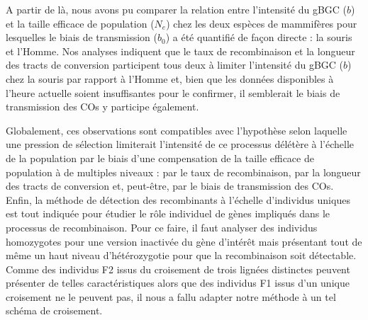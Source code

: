 {%
%
%
%

A partir de là, nous avons pu comparer la relation entre l'intensité du gBGC ($b$) et la taille efficace de population ($N_e$) chez les deux espèces de mammifères pour lesquelles le biais de transmission ($b_0$) a été quantifié de façon directe : la souris et l'Homme.
Nos analyses indiquent que le taux de recombinaison et la longueur des tracts de conversion participent tous deux à limiter l'intensité du gBGC ($b$) chez la souris par rapport à l'Homme et, bien que les données disponibles à l'heure actuelle soient insuffisantes pour le confirmer, il semblerait le biais de transmission des COs y participe également.

Globalement, ces observations sont compatibles avec l'hypothèse selon laquelle une pression de sélection limiterait l’intensité de ce processus délétère à l’échelle de la population par le biais d'une compensation de la taille efficace de population à de multiples niveaux : par le taux de recombinaison, par la longueur des tracts de conversion et, peut-être, par le biais de transmission des COs.\\


Enfin, la méthode de détection des recombinants à l'échelle d'individus uniques est tout indiquée pour étudier le rôle individuel de gènes impliqués dans le processus de recombinaison.
Pour ce faire, il faut analyser des individus homozygotes pour une version inactivée du gène d'intérêt mais présentant tout de même un haut niveau d'hétérozygotie pour que la recombinaison soit détectable.
Comme des individus F2 issus du croisement de trois lignées distinctes peuvent présenter de telles caractéristiques alors que des individus F1 issus d'un unique croisement ne le peuvent pas, il nous a fallu adapter notre méthode à un tel schéma de croisement.

}
